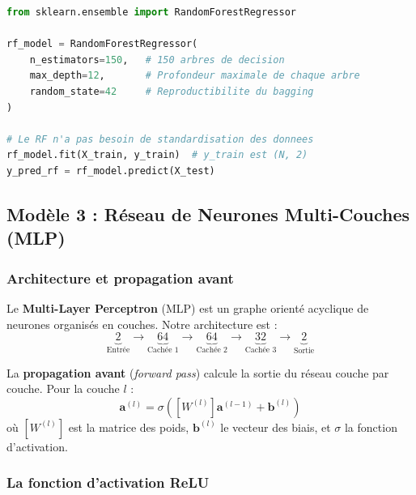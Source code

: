 \documentclass[journal, a4paper, twocolumn]{IEEEtran}
\begin{document}
\begin{lstlisting}[language=Python, caption=Forêt Aléatoire (Random Forest)]
from sklearn.ensemble import RandomForestRegressor

rf_model = RandomForestRegressor(
    n_estimators=150,   # 150 arbres de decision
    max_depth=12,       # Profondeur maximale de chaque arbre
    random_state=42     # Reproductibilite du bagging
)

# Le RF n'a pas besoin de standardisation des donnees
rf_model.fit(X_train, y_train)  # y_train est (N, 2)
y_pred_rf = rf_model.predict(X_test)
\end{lstlisting}

\subsection{Modèle 3 : Réseau de Neurones Multi-Couches (MLP)}

\subsubsection{Architecture et propagation avant}

Le \textbf{Multi-Layer Perceptron} (MLP) est un graphe orienté acyclique de neurones organisés en couches. Notre architecture est :
\begin{equation*}
    \underbrace{2}_{\text{Entrée}} \to \underbrace{64}_{\text{Cachée 1}} \to \underbrace{64}_{\text{Cachée 2}} \to \underbrace{32}_{\text{Cachée 3}} \to \underbrace{2}_{\text{Sortie}}
\end{equation*}

La \textbf{propagation avant} (\textit{forward pass}) calcule la sortie du réseau couche par couche. Pour la couche $l$ :
\begin{equation}
    \bm{a}^{(l)} = \sigma\left([W^{(l)}] \bm{a}^{(l-1)} + \bm{b}^{(l)}\right)
\end{equation}
où $[W^{(l)}]$ est la matrice des poids, $\bm{b}^{(l)}$ le vecteur des biais, et $\sigma$ la fonction d'activation.

\subsubsection{La fonction d'activation ReLU}
\end{document}
